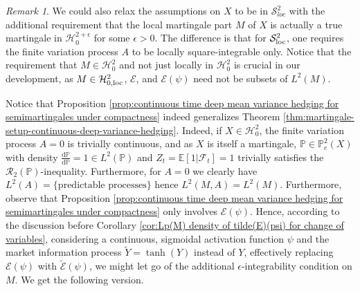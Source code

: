 \documentclass[11pt,a4paper,twoside,openany]{report}
\numberwithin{equation}{section}
\newcommand{\diff}{\mathrm{d}}
\theoremstyle{plain} %
\theoremstyle{definition} %
\theoremstyle{remark} %
\newtheorem{remark}[theorem]{Remark}
\begin{document}
\begin{remark}\label{rem:relaxed assumptions}
    We could also relax the assumptions on \(X\) to be in \(\mathcal{S}^2_{loc}\) with the additional requirement that the local martingale part \(M\) of \(X\) is actually a true martingale in \(\mathcal{H}_0^{2+\epsilon}\) for some \(\epsilon>0\). The difference is that for \(\mathcal{S}_{\rm{loc}}^2\), one requires the finite variation process \(A\) to be locally square-integrable only. Notice that the requirement that \(M\in\mathcal{H}^2_0\) and not just locally in \(\mathcal{H}^2_0\) is crucial in our development, as \(M\in\mathcal{H}^2_{0,\rm{loc}}\), \(\mathcal{E}\), and \(\mathcal{E}(\psi)\) need not be subsets of \(L^2(M)\).
\end{remark}
Notice that Proposition \ref{prop:continuous time deep mean variance hedging for semimartingales under compactness} indeed generalizes Theorem \ref{thm:martingale-setup-continuous-deep-variance-hedging}. Indeed, if \(X\in\mathcal{H}^2_0\), the finite variation process \(A=0\) is trivially continuous, and as \(X\) is itself a martingale, \(\mathbb{P}\in \mathbb{P}_e^2(X)\) with density \(\frac{\diff \mathbb{P}}{\diff \mathbb{P}}=1\in L^2(\mathbb{P})\) and \(Z_t=\mathbb{E}[1|\mathcal{F}_t]=1\) trivially satisfies the \(\mathcal{R}_2(\mathbb{P})\)-inequality. Furthermore, for \(A=0\) we clearly have \(L^2(A)=\{\text{predictable processes}\}\) hence \(L^2(M,A)=L^2(M)\). 
 Furthermore, observe that Proposition \ref{prop:continuous time deep mean variance hedging for semimartingales under compactness} only involves \(\mathcal{E}(\psi)\). Hence, 
according to the discussion before Corollary \ref{cor:Lp(M) density of tilde(E)(psi) for change of variables}, considering a continuous, sigmoidal activation function \(\psi\) and the market information process \(\widetilde{Y}=\tanh(Y)\) instead of \(Y\), effectively replacing \(\mathcal{E}(\psi)\) with \(\widetilde{\mathcal{E}}(\psi)\), we might let go of the additional \(\epsilon\)-integrability condition on \(M\). We get the following version. 
\end{document}
